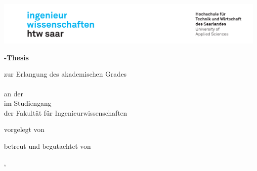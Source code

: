 \begin{titlepage}\linespread{1.5}\selectfont
  \includegraphics[width=\linewidth]{Graphics/htwsaar_Logo_inwi_head_VF_4C_crop}
  \begin{center}
    \large
    \hfill
    \vfill
    \begingroup
    \Large\bfseries\myDegreeType-Thesis
    \endgroup

    \bigskip

    zur Erlangung des akademischen Grades \\
    \myDegree \\
    an der \myUni \\
    im Studiengang \myDegreeCourse \\
    der Fakultät für Ingenieurwissenschaften \\

    \vfill

    \begingroup
    \Large\bfseries\myTitle
    \endgroup

    \bigskip

    vorgelegt von \\
    \myName

    \vfill

    betreut und begutachtet von \\
    \myFirstProf

    \vfill

    \myLocation, \myTime

  \end{center}
\end{titlepage}